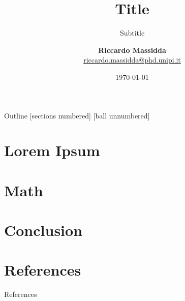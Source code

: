\documentclass[8pt, xcolor=svgnames, compress]{beamer}
\title{Title}
\subtitle{Subtitle}
\author[Name]{
  {\large \textbf{Riccardo Massidda}}\\
  \href{mailto:riccardo.massidda@phd.unipi.it}{\textcolor{main}{riccardo.massidda@phd.unipi.it}}\\
}
\institute[uni]{Department of Computer Science\\University of Pisa}
\date{\today}
\begin{document}
\maketitle

\begin{frame}{Outline}
  [sections numbered] 
  [ball unnumbered]
  \tableofcontents[hideallsubsections]
\end{frame}

\section{Lorem Ipsum}



\section{Math}



\section*{Conclusion}



\section*{References}

\begin{frame}[plain]{References}
    \printbibliography[heading=none]
\end{frame}
\end{document}
